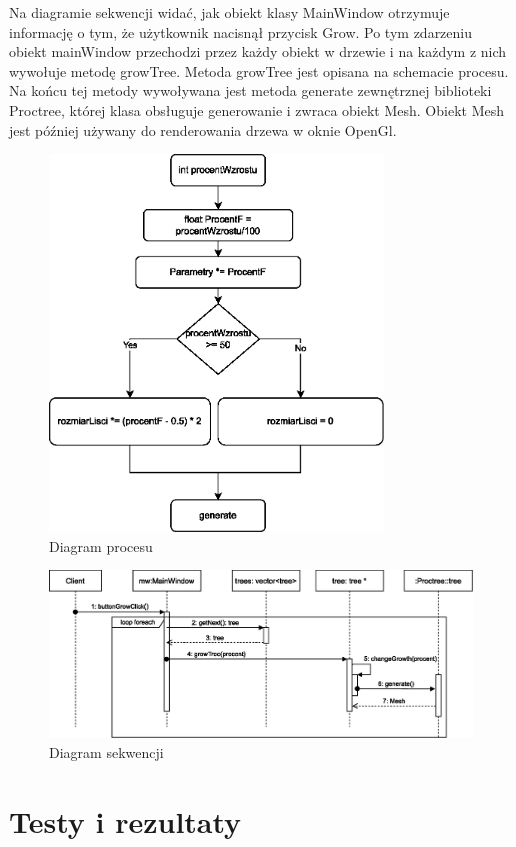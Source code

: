 \documentclass[a4paper,twoside,12pt]{report}
\begin{document}
Na diagramie sekwencji widać, jak obiekt klasy 
MainWindow otrzymuje informację o tym, 
że użytkownik nacisnął przycisk Grow. 
Po tym zdarzeniu obiekt mainWindow przechodzi przez 
każdy obiekt w drzewie i na każdym z nich wywołuje 
metodę growTree. Metoda growTree jest opisana na 
schemacie procesu. Na końcu tej metody wywoływana 
jest metoda generate zewnętrznej biblioteki Proctree, 
której klasa obsługuje generowanie i zwraca obiekt Mesh.
Obiekt Mesh jest później używany do renderowania drzewa 
w oknie OpenGl.

\begin{figure}[H]
	\centering\includegraphics[height=10cm]{grafika/diagrams/flow}
	\caption{Diagram procesu}
    \label{fig:flowDiagram}
\end{figure}

\begin{figure}[H]
	\centering\includegraphics[width=15.5cm]{grafika/diagrams/sequence}
	\caption{Diagram sekwencji}
    \label{fig:sequenceDiagram}
\end{figure}

\chapter{Testy i rezultaty}
\end{document}
